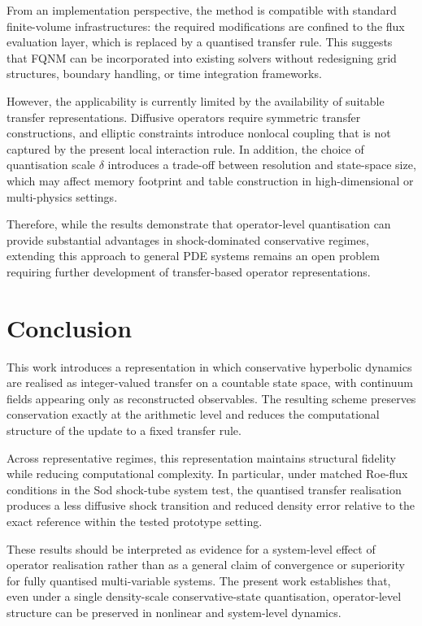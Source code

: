 \documentclass[sn-basic]{sn-jnl}
\theoremstyle{plain}
\theoremstyle{remark}
\begin{document}
From an implementation perspective, the method is compatible with standard finite-volume infrastructures: the required modifications are confined to the flux evaluation layer, which is replaced by a quantised transfer rule. This suggests that FQNM can be incorporated into existing solvers without redesigning grid structures, boundary handling, or time integration frameworks.

However, the applicability is currently limited by the availability of suitable transfer representations. Diffusive operators require symmetric transfer constructions, and elliptic constraints introduce nonlocal coupling that is not captured by the present local interaction rule. In addition, the choice of quantisation scale $\delta$ introduces a trade-off between resolution and state-space size, which may affect memory footprint and table construction in high-dimensional or multi-physics settings.

Therefore, while the results demonstrate that operator-level quantisation can provide substantial advantages in shock-dominated conservative regimes, extending this approach to general PDE systems remains an open problem requiring further development of transfer-based operator representations.

\section{Conclusion}
\label{sec:conclusion}

This work introduces a representation in which conservative hyperbolic dynamics are realised as integer-valued transfer on a countable state space, with continuum fields appearing only as reconstructed observables. The resulting scheme preserves conservation exactly at the arithmetic level and reduces the computational structure of the update to a fixed transfer rule.

Across representative regimes, this representation maintains structural fidelity while reducing computational complexity. In particular, under matched Roe-flux conditions in the Sod shock-tube system test, the quantised transfer realisation produces a less diffusive shock transition and reduced density error relative to the exact reference within the tested prototype setting.

These results should be interpreted as evidence for a system-level effect of operator realisation rather than as a general claim of convergence or superiority for fully quantised multi-variable systems. The present work establishes that, even under a single density-scale conservative-state quantisation, operator-level structure can be preserved in nonlinear and system-level dynamics.
\end{document}
